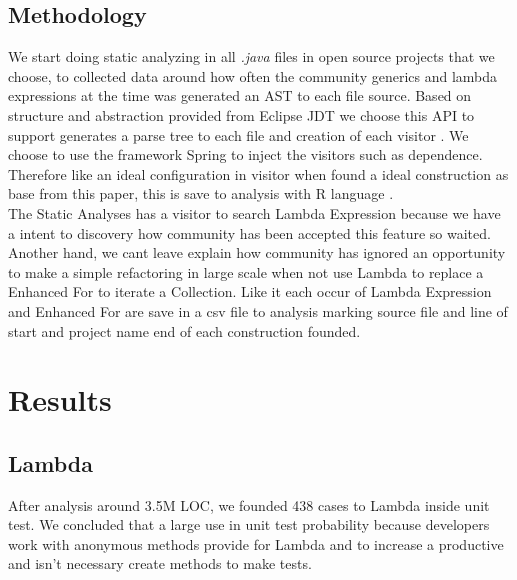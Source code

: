 \documentclass{sig-alternate-05-2015}
\begin{document}



\subsection{Methodology}
We start doing static analyzing in all \textit{.java} files in open source projects that we choose, to collected data around how often the community generics and lambda expressions at the time was generated an AST to each file source. Based on structure and abstraction provided from Eclipse JDT we choose this API to support generates a parse tree to each file and creation of each visitor \cite{Gamma:1995:DPE:186897}. We choose to use the framework Spring to inject the visitors such as dependence. Therefore like an ideal configuration in visitor \cite{Gamma:1995:DPE:186897} when found a ideal construction as base from this paper, this is save to analysis with R language \cite{R}.\\

The Static Analyses has a visitor to search  Lambda Expression because we have a intent to discovery how community has been accepted this feature so waited. Another hand, we cant leave explain how community has ignored an opportunity to make a simple refactoring in large scale when not use Lambda to replace a Enhanced For to iterate a Collection. Like it each occur of Lambda Expression and Enhanced For are save in a csv file to analysis marking source file and line of start and project name end of each construction founded.\\
  

\section{Results}

\subsection{Lambda}
After analysis around 3.5M LOC, we founded 438 cases to Lambda inside unit test. We concluded that a large use in unit test probability because developers work with anonymous methods provide for Lambda and to increase a productive and isn't necessary create methods to make tests.\\
\end{document}
